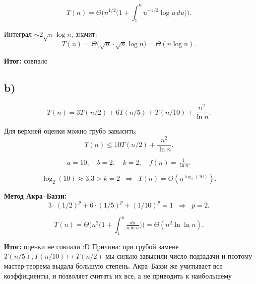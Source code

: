 \documentclass[12pt]{article}
\begin{document}
\[
T(n) = \Theta\!\Big(n^{1/2}\big(1+\int_1^n u^{-1/2}\log u \,du\big)\Big).
\]

Интеграл $\sim 2\sqrt{n}\log n$, значит:
\[
T(n) = \Theta\!\big(\sqrt{n}\cdot \sqrt{n}\log n\big)
      = \Theta(n\log n).
\]

\textbf{Итог:} совпало

\subsection*{b)}
\[
T(n)=3T(n/2)+6T(n/5)+T(n/10)+\frac{n^2}{\ln n}.
\]

Для верхней оценки можно грубо завысить:
\[
T(n)\leq 10T(n/2)+\frac{n^2}{\ln n}.
\]

\[
a=10,\quad b=2,\quad k=2,\quad f(n)=\tfrac{1}{\ln n}.
\]

\[
\log_2(10) \approx 3.3 > k=2 \;\;\Rightarrow\;\; T(n)=O\!\left(n^{\log_2(10)}\right).
\]

\textbf{Метод Акра–Баззи:}
\[
3\cdot (1/2)^p+6\cdot (1/5)^p+(1/10)^p=1 \;\;\Rightarrow\;\; p=2.
\]

\[
T(n) = \Theta\!\Big(n^2 \big(1+\int_1^n \tfrac{du}{u\ln u}\big)\Big)
= \Theta(n^2\ln\ln n).
\]

\textbf{Итог:} оценки не совпали :D  
Причина: при грубой замене $T(n/5),T(n/10)\mapsto T(n/2)$ мы сильно завысили число подзадачи и поэтому мастер-теорема выдала большую степень. Акра–Баззи же учитывает все коэффициенты, и позволяет считать их все, а не приводить к наибольшему
\end{document}
